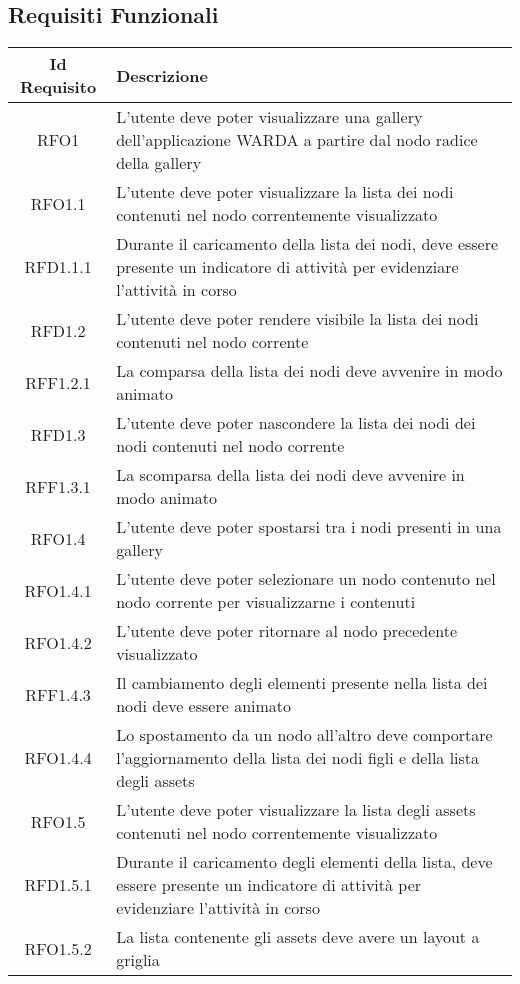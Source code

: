 \clearpage
\subsection{Requisiti Funzionali}
\normalsize
\begin{longtable}{|c|m{10cm}|}
\hline
\textbf{Id Requisito} & \textbf{Descrizione}\\
\hline
\endhead
RFO1 & L'utente deve poter visualizzare una gallery dell'applicazione WARDA a partire dal nodo radice della gallery \\ \hline
RFO1.1 & L'utente deve poter visualizzare la lista dei nodi contenuti nel nodo correntemente visualizzato \\ \hline
RFD1.1.1 & Durante il caricamento della lista dei nodi, deve essere presente un indicatore di attività per evidenziare l'attività in corso \\ \hline
RFD1.2 & L'utente deve poter rendere visibile la lista dei nodi contenuti nel nodo corrente \\ \hline
RFF1.2.1 & La comparsa della lista dei nodi deve avvenire in modo animato \\ \hline
RFD1.3 & L'utente deve poter nascondere la lista dei nodi dei nodi contenuti nel nodo corrente \\ \hline
RFF1.3.1 & La scomparsa della lista dei nodi deve avvenire in modo animato \\ \hline
RFO1.4 & L'utente deve poter spostarsi tra i nodi presenti in una gallery \\ \hline
RFO1.4.1 & L'utente deve poter selezionare un nodo contenuto nel nodo corrente per visualizzarne i contenuti \\ \hline
RFO1.4.2 & L'utente deve poter ritornare al nodo precedente visualizzato \\ \hline
RFF1.4.3 & Il cambiamento degli elementi presente nella lista dei nodi deve essere animato \\ \hline
RFO1.4.4 & Lo spostamento da un nodo all'altro deve comportare l'aggiornamento della lista dei nodi figli e della lista degli assets \\ \hline
RFO1.5 & L'utente deve poter visualizzare la lista degli assets contenuti nel nodo correntemente visualizzato \\ \hline
RFD1.5.1 & Durante il caricamento degli elementi della lista, deve essere presente un indicatore di attività per evidenziare l'attività in corso \\ \hline
RFO1.5.2 & La lista contenente gli assets deve avere un layout a griglia \\ \hline

\end{longtable}

